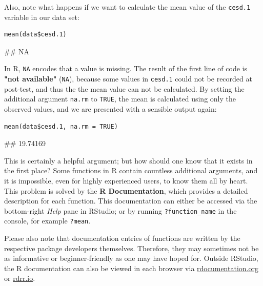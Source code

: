 Also, note what happens if we want to calculate the mean value of the \texttt{cesd.1} variable in our data set:

\begin{lstlisting}
mean(data$cesd.1)
\end{lstlisting}
\begin{example}
## NA
\end{example}

In \textsf{R}, \texttt{NA} encodes that a value is missing.
The result of the first line of code is \textbf{"not available"} (\texttt{NA}), because some values in \texttt{cesd.1} could not be recorded at post-test, and thus the the mean value can not be calculated. By setting the additional argument \texttt{na.rm} to \texttt{TRUE}, the mean is calculated using only the observed values, and we are presented with a sensible output again:

\begin{lstlisting}
mean(data$cesd.1, na.rm = TRUE)
\end{lstlisting}
\begin{example}
## 19.74169
\end{example}

This is certainly a helpful argument; but how should one know that it exists in the first place? Some functions in \textsf{R} contain countless additional arguments, and it is impossible, even for highly experienced users, to know them all by heart. This problem is solved by the \textbf{\textsf{R} Documentation}, which provides a detailed description for each function. This documentation can either be accessed via the bottom-right \emph{Help} pane in RStudio; or by running \texttt{?}\texttt{function\_name} in the console, for example \texttt{?}\texttt{mean}. 

Please also note that documentation entries of functions are written by the respective package developers themselves. Therefore, they may sometimes not be as informative or beginner-friendly as one may have hoped for. Outside RStudio, the \textsf{R} documentation can also be viewed in each browser via \href{https://www.rdocumentation.org}{rdocumentation.org} or \href{https://www.rdrr.io}{rdrr.io}.



